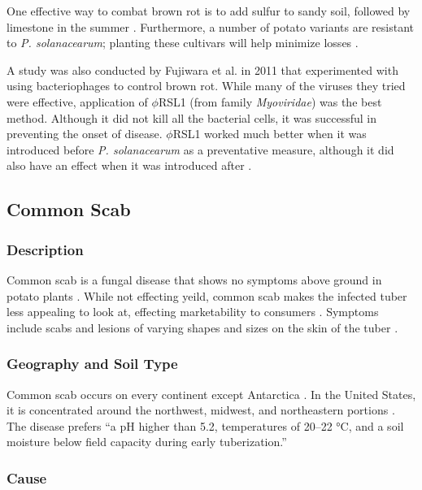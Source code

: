 \documentclass[12pt]{article}
\begin{document}
One effective way to combat brown rot is to add sulfur to sandy soil, followed by limestone in the summer \autocite{rich2013potato}. Furthermore, a number of potato variants are resistant to \emph{P. solanacearum}; planting these cultivars will help minimize losses \autocite{rich2013potato}.

A study was also conducted by Fujiwara et al. in 2011 that experimented with using bacteriophages to control brown rot. While many of the viruses they tried were effective, application of {$\phi$}RSL1 (from family \emph{Myoviridae}) was the best method. Although it did not kill all the bacterial cells, it was successful in preventing the onset of disease. {$\phi$}RSL1 worked much better when it was introduced before \emph{P. solanacearum} as a preventative measure, although it did also have an effect when it was introduced after \autocite{fujiwara2011biocontrol}.


\subsection{Common Scab}

\subsubsection{Description}

Common scab is a fungal disease that shows no symptoms above ground in potato plants \autocite{rich2013potato}. While not effecting yeild, common scab makes the infected tuber less appealing to look at, effecting marketability to consumers \autocite{rich2013potato}. Symptoms include scabs and lesions of varying shapes and sizes on the skin of the tuber \autocite{dees2012search}.

\subsubsection{Geography and Soil Type}

Common scab occurs on every continent except Antarctica \autocite{rich2013potato}. In the United States, it is concentrated around the northwest, midwest, and northeastern portions \autocite{braun2017potato}. The disease prefers ``a pH
higher than 5.2, temperatures of 20–22 °C, and a soil moisture
below field capacity during early tuberization.'' \autocite{braun2017potato, archuleta1981cause}

\subsubsection{Cause}
\end{document}
